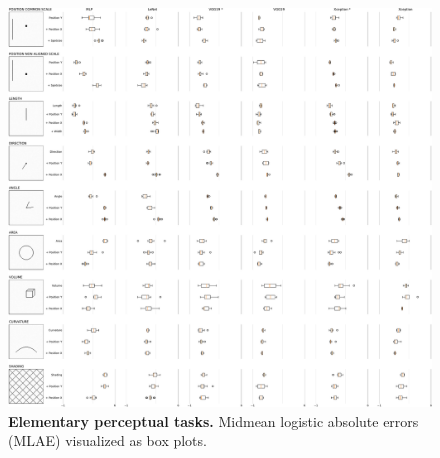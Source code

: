 \documentclass[journal]{vgtc}        %
\begin{document}
\begin{figure}[tbhp]
	\centering
		\includegraphics[width=\linewidth]{../gfx/figure1_boxplot_new.pdf}
  \caption{\textbf{Elementary perceptual tasks.} Midmean logistic absolute errors (MLAE) visualized as box plots.}
	\label{fig:epc_mlae_boxplots}
\end{figure}
\end{document}
